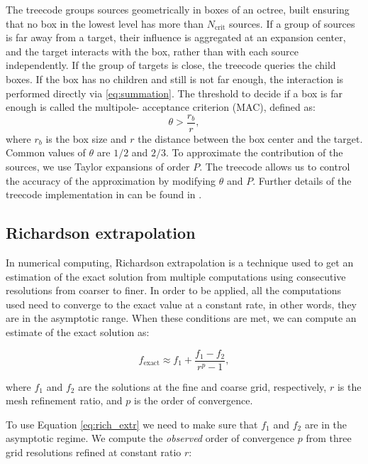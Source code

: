 The treecode groups sources geometrically in boxes of an octree, built ensuring
that no box in the lowest level has more than $N_\text{crit}$ sources. If a group of
sources is far away from a target, their influence is aggregated at an expansion center,
and the target interacts with the box, rather than with each source independently.
If the group of targets is  close, the treecode queries the child
boxes. If the box has no children and still is not far enough, the interaction is 
performed directly via \eqref{eq:summation}.
 The threshold to decide if a box is far enough is called the multipole-
acceptance criterion (MAC), defined as:
%
\begin{equation}
\theta > \frac{r_b}{r},
\end{equation}
%
where $r_b$ is the box size and $r$ the distance between the box center and the target.
Common values of $\theta$ are $1/2$ and $2/3$.
To approximate the contribution of the sources, we use Taylor expansions
of order $P$.
The treecode allows us to control the accuracy of the approximation by modifying $\theta$ and $P$.
Further details of the treecode implementation in \pygbe can be found in \cite{CooperBarba-share154331,CooperBardhanBarba2013}.

\subsection{Richardson extrapolation} \label{sec:rich_extrapolation}

In numerical computing, Richardson extrapolation is a technique used to get an estimation
of the exact solution from multiple computations using consecutive resolutions from coarser
to finer. In order to be applied, all the computations used need to converge to the exact value
at a constant rate, in other words, they are in the asymptotic range. When these conditions are met,
we can compute an estimate of the exact solution as:

\begin{equation} \label{eq:rich_extr}
   f_{\text{exact}} \approx f_1 + \frac{f_1 - f_2}{r^{p} - 1},
\end{equation} 

where $f_1$ and $f_2$ are the solutions at the fine and coarse grid, respectively, 
$r$ is the mesh refinement ratio, and $p$ is the order of convergence.

To use Equation \eqref{eq:rich_extr} we need to make sure that $f_1$ and $f_2$ are in the 
asymptotic regime. We compute the \textit{observed} order of convergence $p$ from three grid resolutions
refined at constant ratio $r$:

